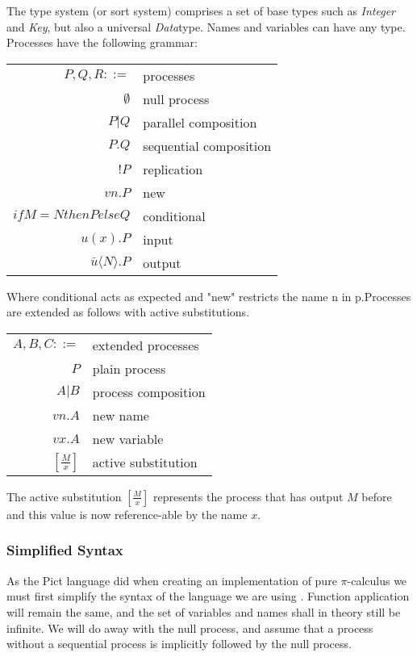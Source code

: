 The type system (or sort system) comprises a set of base types such as \emph{Integer} and \emph{Key}, but also a universal \emph{Data}type. Names and variables can have any type. 
Processes have the following grammar:

\begin{table}[hc!]
    \begin{tabular}{r l}
         $P,Q,R ::=$ & processes  \\
         $\emptyset$& null process\\
        $P|Q$& parallel composition\\
        $P.Q$& sequential composition\\
        $!P$& replication \\
        $vn.P$& new \\
        $if M=N then P else Q $& conditional \\
        $u(x).P$& input \\
        $\bar{u}\langle N \rangle .P$& output \\
    \end{tabular}
\end{table} 
Where conditional acts as expected and "new" restricts the name n in p.Processes are extended as follows with active substitutions.

\begin{table}[hc!]
    \begin{tabular}{r l}
         $A,B,C ::=$ & extended processes  \\
        $P$& plain process\\
        $A|B$& process composition \\
        $vn.A$& new name \\
        $vx.A$& new variable \\
        $\left[ \frac{M}{x} \right]$&  active substitution \\
    \end{tabular}
\end{table} 

The active substitution $\left[ \frac{M}{x} \right]$ represents the process that has output $M$ before and this value is now reference-able by the name $x$.

\subsubsection{Simplified Syntax}

As the Pict language did when creating an implementation of pure $\pi$-calculus we must first simplify the syntax of the language we are using \cite{pt97}. Function application will remain the same, and the set of variables and names shall in theory still be infinite. We will do away with the null process, and assume that a process without a sequential process is implicitly followed by the null process.


